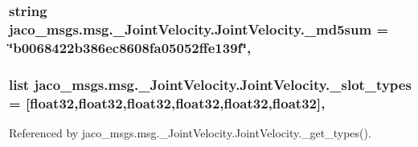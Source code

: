 \subsubsection[{\texorpdfstring{\+\_\+md5sum}{_md5sum}}]{\setlength{\rightskip}{0pt plus 5cm}string jaco\+\_\+msgs.\+msg.\+\_\+\+Joint\+Velocity.\+Joint\+Velocity.\+\_\+md5sum = \char`\"{}b0068422b386ec8608fa05052ffe139f\char`\"{}\hspace{0.3cm}{\ttfamily [static]}, {\ttfamily [private]}}\hypertarget{classjaco__msgs_1_1msg_1_1__JointVelocity_1_1JointVelocity_a32be9ed5f087850ba8bb16b451bfa2b2}{}\label{classjaco__msgs_1_1msg_1_1__JointVelocity_1_1JointVelocity_a32be9ed5f087850ba8bb16b451bfa2b2}
\subsubsection[{\texorpdfstring{\+\_\+slot\+\_\+types}{_slot_types}}]{\setlength{\rightskip}{0pt plus 5cm}list jaco\+\_\+msgs.\+msg.\+\_\+\+Joint\+Velocity.\+Joint\+Velocity.\+\_\+slot\+\_\+types = \mbox{[}\textquotesingle{}float32\textquotesingle{},\textquotesingle{}float32\textquotesingle{},\textquotesingle{}float32\textquotesingle{},\textquotesingle{}float32\textquotesingle{},\textquotesingle{}float32\textquotesingle{},\textquotesingle{}float32\textquotesingle{}\mbox{]}\hspace{0.3cm}{\ttfamily [static]}, {\ttfamily [private]}}\hypertarget{classjaco__msgs_1_1msg_1_1__JointVelocity_1_1JointVelocity_a5f2317894962d3140c85fa59eadabf47}{}\label{classjaco__msgs_1_1msg_1_1__JointVelocity_1_1JointVelocity_a5f2317894962d3140c85fa59eadabf47}


Referenced by jaco\+\_\+msgs.\+msg.\+\_\+\+Joint\+Velocity.\+Joint\+Velocity.\+\_\+get\+\_\+types().

